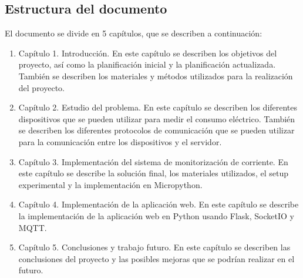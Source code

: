 \begin{titlepage}
\section{Estructura del documento}
El documento se divide en 5 capítulos, que se describen a continuación:
\begin{enumerate}
\item Capítulo 1. Introducción. En este capítulo se describen los objetivos del proyecto, así como la planificación inicial y la planificación actualizada. También se describen los materiales y métodos utilizados para la realización del proyecto. 
\item Capítulo 2. Estudio del problema. En este capítulo se describen los diferentes dispositivos que se pueden utilizar para medir el consumo eléctrico. También se describen los diferentes protocolos de comunicación que se pueden utilizar para la comunicación entre los dispositivos y el servidor.
\item Capítulo 3. Implementación del sistema de monitorización de corriente. En este capítulo se describe la solución final, los materiales utilizados, el setup experimental y la implementación en Micropython.
\item Capítulo 4. Implementación de la aplicación web. En este capítulo se describe la implementación de la aplicación web en Python usando Flask, SocketIO y MQTT.
\item Capítulo 5. Conclusiones y trabajo futuro. En este capítulo se describen las conclusiones del proyecto y las posibles mejoras que se podrían realizar en el futuro.
\end{enumerate}

\end{titlepage}
